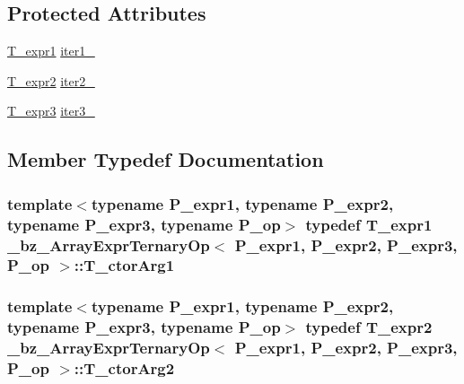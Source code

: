 \subsection*{Protected Attributes}
\begin{DoxyCompactItemize}
\item 
\hyperlink{class__bz__ArrayExprTernaryOp_af7fa0e8d4f015bc9ab42313078639196}{T\+\_\+expr1} \hyperlink{class__bz__ArrayExprTernaryOp_aaf3916a8aa781a5dd0db6eff09b4e690}{iter1\+\_\+}
\item 
\hyperlink{class__bz__ArrayExprTernaryOp_a392ed3a88602f5352a558ce6277cde22}{T\+\_\+expr2} \hyperlink{class__bz__ArrayExprTernaryOp_a81b5d29c3eb018ba6b03887ecfd56073}{iter2\+\_\+}
\item 
\hyperlink{class__bz__ArrayExprTernaryOp_a809b1acdc0c2ffe359711f40d2688526}{T\+\_\+expr3} \hyperlink{class__bz__ArrayExprTernaryOp_a2a52ad2adb9af512f88a3a4ce4dff21b}{iter3\+\_\+}
\end{DoxyCompactItemize}


\subsection{Member Typedef Documentation}
\hypertarget{class__bz__ArrayExprTernaryOp_a22e778272db72fb375b982abafddc608}{}
\subsubsection[{T\+\_\+ctor\+Arg1}]{\setlength{\rightskip}{0pt plus 5cm}template$<$typename P\+\_\+expr1, typename P\+\_\+expr2, typename P\+\_\+expr3, typename P\+\_\+op$>$ typedef {\bf T\+\_\+expr1} {\bf \+\_\+bz\+\_\+\+Array\+Expr\+Ternary\+Op}$<$ P\+\_\+expr1, P\+\_\+expr2, P\+\_\+expr3, P\+\_\+op $>$\+::{\bf T\+\_\+ctor\+Arg1}}\label{class__bz__ArrayExprTernaryOp_a22e778272db72fb375b982abafddc608}
\hypertarget{class__bz__ArrayExprTernaryOp_aa738422b796c355bfb6e745a465a3d82}{}
\subsubsection[{T\+\_\+ctor\+Arg2}]{\setlength{\rightskip}{0pt plus 5cm}template$<$typename P\+\_\+expr1, typename P\+\_\+expr2, typename P\+\_\+expr3, typename P\+\_\+op$>$ typedef {\bf T\+\_\+expr2} {\bf \+\_\+bz\+\_\+\+Array\+Expr\+Ternary\+Op}$<$ P\+\_\+expr1, P\+\_\+expr2, P\+\_\+expr3, P\+\_\+op $>$\+::{\bf T\+\_\+ctor\+Arg2}}\label{class__bz__ArrayExprTernaryOp_aa738422b796c355bfb6e745a465a3d82}
\hypertarget{class__bz__ArrayExprTernaryOp_a16f21234186e83d551d36d5b248aeeeb}{}
